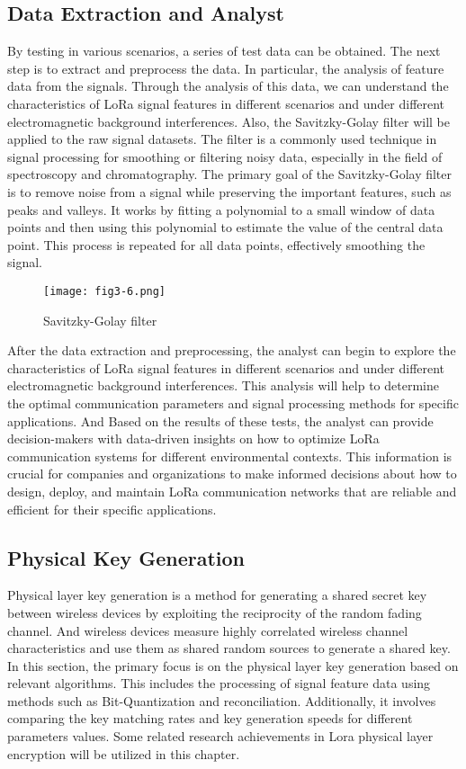\subsection{Data Extraction and Analyst}
By testing in various scenarios, a series of test data can be obtained. The next step is to extract and preprocess the data. In particular, the analysis of feature data from the signals. Through the analysis of this data, we can understand the characteristics of LoRa signal features in different scenarios and under different electromagnetic background interferences.
Also, the Savitzky-Golay filter will be applied to the raw signal datasets. The filter is a commonly used technique in signal processing for smoothing or filtering noisy data, especially in the field of spectroscopy and chromatography. The primary goal of the Savitzky-Golay filter\cite{doi:10.1021/ac60214a047} is to remove noise from a signal while preserving the important features, such as peaks and valleys. It works by fitting a polynomial to a small window of data points and then using this polynomial to estimate the value of the central data point. This process is repeated for all data points, effectively smoothing the signal.
\begin{figure}
  \centering
  \texttt{[image: fig3-6.png]}
  \caption{Savitzky-Golay filter}
  \label{fig:3-6}
\end{figure}
After the data extraction and preprocessing, the analyst can begin to explore the characteristics of LoRa signal features in different scenarios and under different electromagnetic background interferences. This analysis will help to determine the optimal communication parameters and signal processing methods for specific applications. And Based on the results of these tests, the analyst can provide decision-makers with data-driven insights on how to optimize LoRa communication systems for different environmental contexts. This information is crucial for companies and organizations to make informed decisions about how to design, deploy, and maintain LoRa communication networks that are reliable and efficient for their specific applications.

\subsection{Physical Key Generation}
Physical layer key generation is a method for generating a shared secret key between wireless devices by exploiting the reciprocity of the random fading channel. And wireless devices measure highly correlated wireless channel characteristics and use them as shared random sources to generate a shared key.
In this section, the primary focus is on the physical layer key generation based on relevant algorithms. This includes the processing of signal feature data using methods such as Bit-Quantization and reconciliation. Additionally, it involves comparing the key matching rates and key generation speeds for different parameters values. Some related research achievements in Lora physical layer encryption will be utilized in this chapter.

